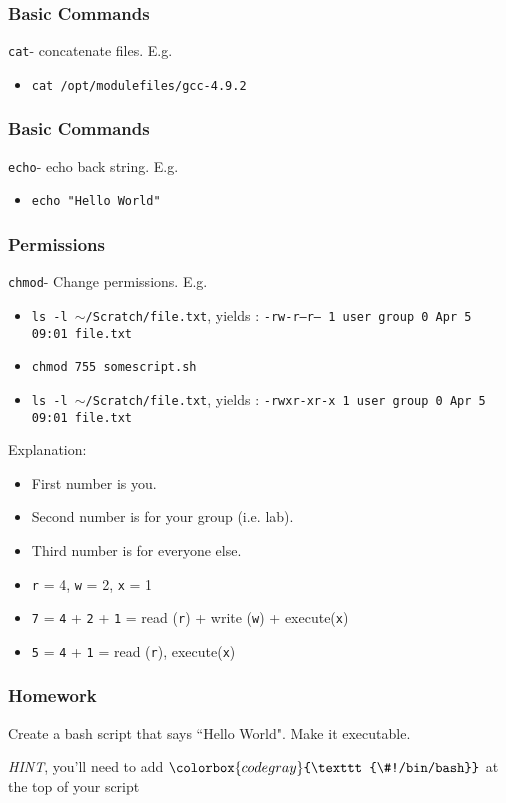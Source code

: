 \documentclass{beamer}
\newcommand{\code}[1]{\colorbox{codegray}{\texttt{#1}}}
\begin{document}
\begin{frame}
\frametitle{Basic Commands}
\code{cat}- concatenate files. E.g.
\bigskip
\begin{itemize}
    \item \code{cat /opt/modulefiles/gcc-4.9.2}
\end{itemize}
\end{frame}


\begin{frame}
\frametitle{Basic Commands}
\code{echo}- echo back string. E.g.
\bigskip
\begin{itemize}
    \item \code{echo "Hello World"}
\end{itemize}
\end{frame}


\begin{frame}
\frametitle{Permissions}
\code{chmod}- Change permissions.
E.g.
\begin{itemize}
    \item \code{ls -l $\sim$/Scratch/file.txt}, yields : 
    \hspace{5mm} \code{-rw-r--r--  1 user group 0 Apr  5 09:01 file.txt}
    \smallskip
    \item \code{chmod 755 somescript.sh}
    \bigskip
    \item \code{ls -l $\sim$/Scratch/file.txt}, yields : 
    \hspace{5mm} \code{-rwxr-xr-x  1 user group 0 Apr  5 09:01 file.txt}
\end{itemize}
\bigskip

Explanation:
\begin{itemize}
    \item First number is you.
    \item Second number is for your group (i.e. lab).
    \item Third number is for everyone else.
    \item \code{r} = 4, \code{w} = 2, \code{x} = 1
    \item \code{7} = \code{4} + \code{2} + \code{1} = read (\code{r}) + write (\code{w}) +  execute(\code{x})
    \item \code{5} = \code{4} + \code{1} = read (\code{r}), execute(\code{x})
\end{itemize}
\end{frame}

\begin{frame}
\frametitle{Homework}
Create a bash script that says ``Hello World". Make it executable. 

\bigskip

\emph{HINT}, you'll need to add $\code{\#^^21/bin/bash}$ at the top of your script
\end{frame}
\end{document}
